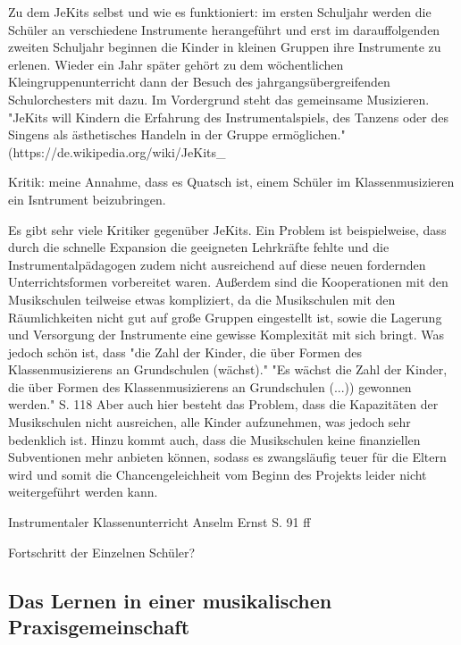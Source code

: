 Zu dem JeKits selbst und wie es funktioniert: im ersten Schuljahr werden die
Schüler an verschiedene Instrumente herangeführt und erst im darauffolgenden
zweiten Schuljahr beginnen die Kinder in kleinen Gruppen ihre Instrumente zu
erlenen. Wieder ein Jahr später gehört zu dem wöchentlichen
Kleingruppenunterricht dann der Besuch des jahrgangsübergreifenden Schulorchesters mit
dazu. Im Vordergrund steht das gemeinsame Musizieren. "JeKits will Kindern die
Erfahrung des Instrumentalspiels, des Tanzens oder des Singens als ästhetisches 
Handeln in der Gruppe ermöglichen." (https://de.wikipedia.org/wiki/JeKits_%



Kritik:
meine Annahme, dass es Quatsch ist, einem Schüler im Klassenmusizieren
ein Isntrument beizubringen.

Es gibt sehr viele Kritiker gegenüber JeKits. Ein Problem ist beispielweise,
dass durch die schnelle Expansion die geeigneten Lehrkräfte fehlte und die
Instrumentalpädagogen zudem nicht ausreichend auf diese neuen fordernden
Unterrichtsformen vorbereitet waren. Außerdem sind die Kooperationen mit den
Musikschulen teilweise etwas kompliziert, da die Musikschulen mit den
Räumlichkeiten nicht gut auf große Gruppen eingestellt ist, sowie die Lagerung
und Versorgung der Instrumente eine gewisse Komplexität mit sich bringt. 
Was jedoch schön ist, dass "die Zahl der Kinder, die über Formen des
Klassenmusizierens an Grundschulen (wächst)." 
"Es wächst die Zahl der Kinder, die über Formen des Klassenmusizierens an
Grundschulen (...)) gewonnen werden." S. 118 
Aber auch hier besteht das Problem, dass die Kapazitäten der Musikschulen nicht
ausreichen, alle Kinder aufzunehmen, was jedoch sehr bedenklich ist. Hinzu kommt
auch, dass die Musikschulen keine finanziellen Subventionen mehr anbieten
können, sodass es zwangsläufig teuer für die Eltern wird und somit die
Chancengeleichheit vom Beginn des Projekts leider nicht weitergeführt werden
kann.

Instrumentaler Klassenunterricht
Anselm Ernst S. 91 ff

Fortschritt der Einzelnen Schüler?



\subsection{Das Lernen in einer musikalischen Praxisgemeinschaft}
